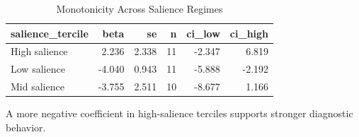 \begin{table}[!htbp]
    \centering
    \caption{Monotonicity Across Salience Regimes}
    \label{tab:heterogeneity_monotonicity}
    \begin{threeparttable}

        \begin{tabular}{lrrrrr}
            \toprule
            salience\_tercile & beta   & se    & n  & ci\_low & ci\_high \\
            \midrule
            High salience     & 2.236  & 2.338 & 11 & -2.347  & 6.819    \\
            Low salience      & -4.040 & 0.943 & 11 & -5.888  & -2.192   \\
            Mid salience      & -3.755 & 2.511 & 10 & -8.677  & 1.166    \\
            \bottomrule
        \end{tabular}
        \begin{tablenotes}[flushleft]
            \footnotesize
            \item A more negative coefficient in high-salience terciles supports stronger diagnostic behavior.
        \end{tablenotes}
    \end{threeparttable}
\end{table}
